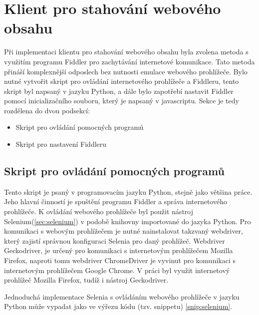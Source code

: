 \documentclass[thesis=M,czech,hidelinks]{FITthesis}[2013/05/06]
\begin{document}
\section{Klient pro stahování webového obsahu} \label{sec:stahovani}
Při implementaci klientu pro stahování webového obsahu byla zvolena metoda s využitím programu Fiddler pro zachytávání internetové komunikace. Tato metoda přináší komplexnější odposlech bez nutnosti emulace webového prohlížeče. Bylo nutné vytvořit skript pro ovládání internetového prohlížeče a Fiddleru, tento skript byl napsaný v jazyku Python, a dále bylo zapotřebí nastavit Fiddler pomocí inicializačního souboru, který je napsaný v javascriptu. Sekce je tedy rozdělena do dvou podsekcí:
\begin{itemize}
	\item Skript pro ovládání pomocných programů
	\item Skript pro nastavení Fiddleru
\end{itemize}

\subsection{Skript pro ovládání pomocných programů}
Tento skript je psaný v programovacím jazyku Python, stejně jako většina práce. Jeho hlavní činností je spuštění programu Fiddler a správa internetového prohlížeče. K ovládání webového prohlížeče byl použit nástroj Selenium(\ref{sec:selenium}) v podobě knihovny importované do jazyka Python. Pro komunikaci s webovým prohlížečem je nutné nainstalovat takzvaný webdriver, který zajistí správnou konfiguraci Selenia pro daný prohlížeč. Webdriver Geckodriver\cite{gecko}, je určený pro komunikaci s internetovým prohlížečem Mozilla Firefox\cite{firefox}, naproti tomu webdriver ChromeDriver\cite{chromedriver}  je vyvinut  pro komunikaci s internetovým prohlížečem Google Chrome\cite{chrome}. V práci byl využit internetový prohlížeč Mozilla Firefox, tudíž i nástroj Geckodriver.

Jednoduchá implementace Selenia s ovládáním webového prohlížeče v jazyku Python může vypadat jako ve výřezu kódu (tzv. snippetu) \ref{snip:selenium}.
\end{document}
